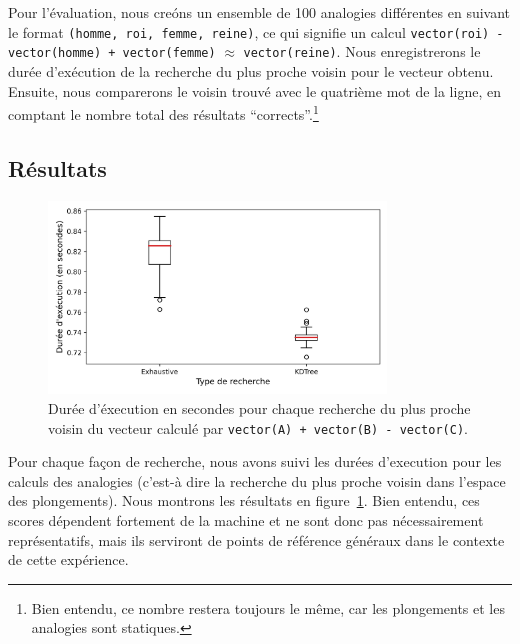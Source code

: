 \documentclass[12pt]{article}
\begin{document}

Pour l'évaluation, nous creóns un ensemble de 100 analogies différentes en suivant le format \texttt{(homme, roi, femme, reine)}, ce qui signifie un calcul \texttt{vector(roi) - vector(homme) + vector(femme)} $\approx$ \texttt{vector(reine)}. Nous enregistrerons le durée d'exécution de la recherche du plus proche voisin pour le vecteur obtenu. Ensuite, nous comparerons le voisin trouvé avec le quatrième mot de la ligne, en comptant le nombre total des résultats ``corrects''.\footnote{Bien entendu, ce nombre restera toujours le même, car les plongements et les analogies sont statiques.} 

\subsection{Résultats} \label{résultats-2}

\begin{figure}[htpb]
    \centering
    \includegraphics[width=0.8\textwidth]{img/times.png}
    \caption{Durée d'éxecution en secondes pour chaque recherche du plus proche voisin du vecteur calculé par \texttt{vector(A) + vector(B) - vector(C)}.}
    \label{fig:times}
\end{figure}

Pour chaque façon de recherche, nous avons suivi les durées d'execution pour les calculs des analogies (c'est-à dire la recherche du plus proche voisin dans l'espace des plongements). Nous montrons les résultats en figure~\ref{fig:times}. Bien entendu, ces scores dépendent fortement de la machine et ne sont donc pas nécessairement représentatifs, mais ils serviront de points de référence généraux dans le contexte de cette expérience. 
\end{document}
